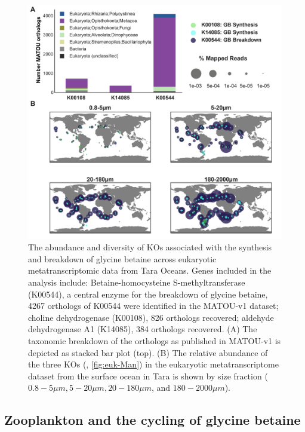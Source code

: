 \documentclass[utf8]{frontiersSCNS} %
\begin{document}
\begin{figure}[t!]
    \centering
    \includegraphics[width=0.85\columnwidth]{Figures/Euk_K00544_GBbreakdown-01.png}
    \caption{The abundance and diversity of KOs associated with the synthesis and breakdown of glycine betaine across eukaryotic metatranscriptomic data from Tara Oceans. Genes included in the analysis include: Betaine-homocysteine S-methyltransferase (K00544), a central enzyme for the breakdown of glycine betaine, 4267 orthologs of K00544 were identified in the MATOU-v1 dataset; choline dehydrogenase (K00108), 826 orthologs recovered; aldehyde dehydrogenase A1 (K14085), 384 orthologs recovered. (A) The taxonomic breakdown of the orthologs as published in MATOU-v1 is depicted as stacked bar plot (top). (B) The relative abundance of the three KOs (, \ref{fig:euk-Man}) in the eukaryotic metatranscriptome dataset from the surface ocean in Tara is shown by size fraction ($0.8-5 \mu m, 5-20 \mu m, 20-180 \mu m$, and $180-2000\mu m$).}
    \label{fig:tara-meta}
\end{figure}

\subsection{Zooplankton and the cycling of glycine betaine}
\end{document}
